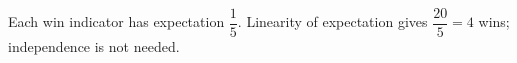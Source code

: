 Each win indicator has expectation $\dfrac{1}{5}$. Linearity of expectation gives $\dfrac{20}{5} = \boxed{4}$ wins; independence is not needed.
